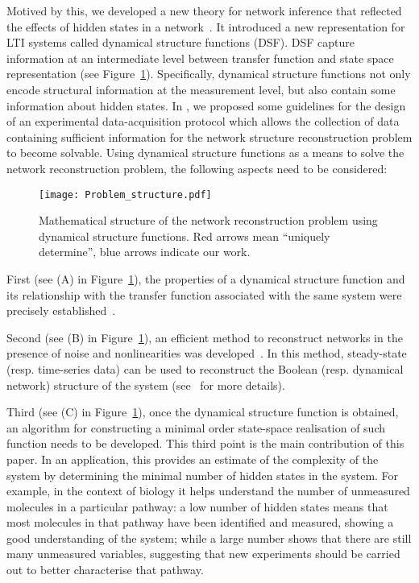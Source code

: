 \documentclass[twocolumn,12pt]{autart}
\theoremstyle{plain}
\begin{document}
Motived by this, we developed a new theory for network inference that reflected the effects of hidden states in a network~\cite{08net_rec}. It introduced a new representation for LTI systems called dynamical structure functions (DSF). DSF capture information at an intermediate level between transfer function and state space
representation (see Figure~\ref{Fig:math}). Specifically, dynamical structure functions not only encode structural information at the measurement level, but also contain some
information about hidden states. In \cite{08net_rec}, we proposed some guidelines for the design of an experimental data-acquisition protocol which allows the collection of data containing sufficient information for the network structure reconstruction problem
to become solvable. Using dynamical structure functions as a means to solve the network reconstruction problem, the following aspects need to be considered:
\begin{figure}
\centering
\texttt{[image: Problem\_structure.pdf]}
\caption{Mathematical structure of the network reconstruction problem using dynamical structure functions. Red arrows mean ``uniquely determine'', blue arrows indicate our work.}\label{Fig:math}
\end{figure}

First (see (A) in Figure~\ref{Fig:math}), the properties of a dynamical
structure function and its relationship with the transfer
function associated with the same system were precisely established~\cite{08net_rec}.


Second (see (B) in Figure~\ref{Fig:math}), an efficient method to reconstruct networks in the presence of noise and nonlinearities was developed~\cite{robust}.
In this method, steady-state (resp. time-series data) can be used to reconstruct the Boolean (resp. dynamical network) structure of the system (see~\cite{robust} for more details). 

Third (see (C) in Figure~\ref{Fig:math}), once the dynamical structure function is obtained, an algorithm for constructing a minimal order state-space realisation of such function needs to be developed. This third point is the main contribution of this paper. In an application, this provides an estimate of the complexity of the system by determining the minimal number of hidden states in the system. For example, in the context of biology it helps understand the number of unmeasured molecules in a particular pathway: a low number of hidden states means that most molecules in that pathway have been identified and measured, showing a good understanding of the system; while a large number shows that there are still many unmeasured variables, suggesting that new experiments should be carried out to better characterise that pathway.
\end{document}
